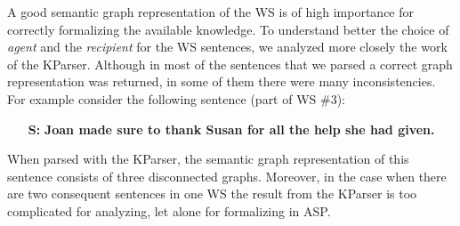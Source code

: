 A good semantic graph representation of the WS is of high importance for correctly formalizing the available knowledge. To understand better the choice of \textit{agent} and the \textit{recipient} for the WS sentences, we analyzed more closely the work of the KParser. Although in most of the sentences that we parsed a correct graph representation was returned, in some of them there were many inconsistencies. For example consider the following sentence (part of WS \#3):
\begin{itemize}
	\item[\textbf{S:}] \textbf{Joan made sure to thank Susan for all the help she had given.}
\end{itemize}
When parsed with the KParser, the semantic graph representation of this sentence consists of three disconnected graphs. Moreover, in the case when there are two consequent sentences in one WS the result from the KParser is too complicated for analyzing, let alone for formalizing in ASP. 



